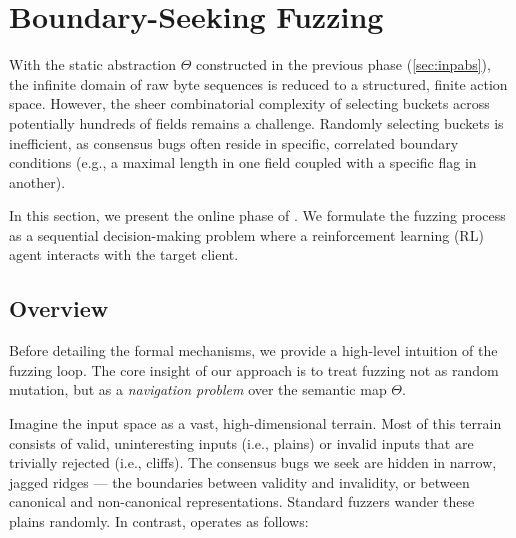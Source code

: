 \section{Boundary-Seeking Fuzzing}\label{sec:fuzzing}


With the static abstraction $\Theta$ constructed in the previous phase (\autoref{sec:inpabs}), the infinite domain of raw byte sequences is reduced to a structured, finite action space. However, the sheer combinatorial complexity of selecting buckets across potentially hundreds of fields remains a challenge. Randomly selecting buckets is inefficient, as consensus bugs often reside in specific, correlated boundary conditions (e.g., a maximal length in one field coupled with a specific flag in another).

In this section, we present the online phase of \tool. We formulate the fuzzing process as a sequential decision-making problem where a reinforcement learning (RL) agent interacts with the target client.

\subsection{Overview}
\label{sec:fuzzing_overview}

Before detailing the formal mechanisms, we provide a high-level intuition of the \tool fuzzing loop. The core insight of our approach is to treat fuzzing not as random mutation, but as a \textit{navigation problem} over the semantic map $\Theta$.

Imagine the input space as a vast, high-dimensional terrain. Most of this terrain consists of valid, uninteresting inputs (i.e., plains) or invalid inputs that are trivially rejected (i.e., cliffs). The consensus bugs we seek are hidden in narrow, jagged ridges --- the boundaries between validity and invalidity, or between canonical and non-canonical representations. Standard fuzzers wander these plains randomly. In contrast, \tool operates as follows:

